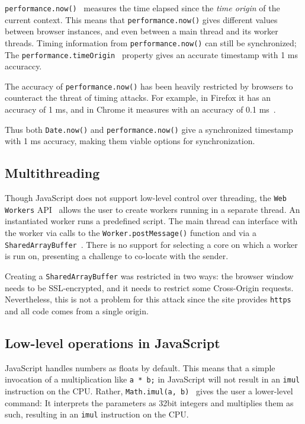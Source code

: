 \documentclass[11pt,
  titlepage=false,
]{scrreprt}
\begin{document}
\texttt{performance.now()}~\cite{performancenow} measures the time elapsed since the \textit{time origin} of the current context.
This means that \texttt{performance.now()} gives different values between browser instances, and even between a main thread and its worker threads.
Timing information from \texttt{performance.now()} can still be synchronized;
The \texttt{performance.timeOrigin}~\cite{performanceTimeOrigin} property gives an accurate timestamp with 1 ms accuraccy.

The accuracy of \texttt{performance.now()} has been heavily restricted by browsers to counteract the threat of timing attacks.
For example, in Firefox it has an accuracy of 1 ms, and in Chrome it measures with an accuracy of 0.1 ms~\cite{performancenow, performancenowchrome}.

Thus both \texttt{Date.now()} and \texttt{performance.now()} give a synchronized timestamp with 1 ms accuracy, making them viable options for synchronization.

\subsection{Multithreading}\label{subsec:multithreading}
Though JavaScript does not support low-level control over threading, the \texttt{Web Workers} API~\cite{webworkers} allows the user to create workers running in a separate thread.
An instantiated worker runs a predefined script.
The main thread can interface with the worker via calls to the \texttt{Worker.postMessage()} function and via a \texttt{SharedArrayBuffer}~\cite{sharedarraybuffer}.
There is no support for selecting a core on which a worker is run on, presenting a challenge to co-locate with the sender.

Creating a \texttt{SharedArrayBuffer} was restricted in two ways: the browser window needs to be SSL-encrypted, and it needs to restrict some Cross-Origin requests.
Nevertheless, this is not a problem for this attack since the site provides \texttt{https} and all code comes from a single origin.


\subsection{Low-level operations in JavaScript}\label{subsec:lowleveljs}
JavaScript handles numbers as floats by default.
This means that a simple invocation of a multiplication like \texttt{a * b;} in JavaScript will not result in an \texttt{imul} instruction on the CPU.
Rather, \texttt{Math.imul(a, b)}~\cite{mathimul} gives the user a lower-level command:
It interprets the parameters as 32bit integers and multiplies them as such, resulting in an \texttt{imul} instruction on the CPU.
\end{document}

